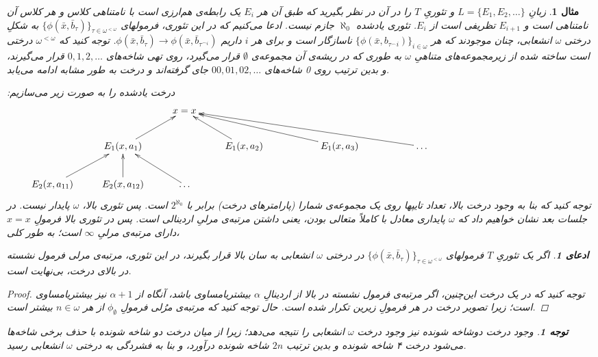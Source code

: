\documentclass[12pt,a4paper]{report}
\theoremstyle{colorhead}
\newtheorem{mesal}[thm]{مثال}
\newtheorem{tav}[thm]{توجه}
\newtheorem{claim}[thm]{ادعای}
\begin{document}
\begin{mesal}
زبانِ
$L=\{E_1,E_2,\ldots\}$
و تئوریِ
$T$
را در آن در نظر بگیرید که طبق آن هر
$E_i$
یک رابطه‌ی هم‌ارزی است با نامتناهی کلاس و هر کلاس آن نامتناهی است و 
$E_{i+1}$
تظریفی است از
$E_i$.
تئوری یادشده 
$\aleph_0$
جازم نیست. ادعا می‌کنیم که 
در این تئوری،
فرمولهای
$\{\phi(\bar{x},\bar{b}_\tau)\}_{\tau\in \omega^{<\omega}}$
به شکلِ درختی
$\omega$
انشعابی،
چنان موجودند که هر
$\{\phi(\bar{x},b_{\tau^\frown i})\}_{i\in \omega}$
ناسازگار است و 
برای هر
$i$
داریم
$\phi(\bar{x},\bar{b}_\tau)\to \phi(\bar{x},\bar{b}_{\tau^{\frown i}})$.
توجه کنید که
$\omega^{<\omega}$
درختی است ساخته شده از زیرمجموعه‌های متناهیِ
$\omega$
به طوری که در  ریشه‌ی آن مجموعه‌ی
$\emptyset$ 
قرار می‌گیرد، روی تهی شاخه‌های
$0,1,2,\ldots$
قرار می‌گیرند، و بدین ترتیب روی 0 شاخه‌های
$00,01,02,\ldots$
جای گرفته‌اند و درخت به طور مشابه ادامه می‌یابد.
\par 
درخت یادشده را به صورت زیر می‌سازیم:
\[
\xymatrix{
 & & x=x&  & & &  &  &  & &  & &
\\
 & E_1(x,a_1) \ar[ur]&  & E_1(x,a_2)\ar[ul]&  & E_1(x,a_3)\ar[ulll]& & \ar[ulllll] \ldots &  & & & &
\\
E_2(x,a_{11})\ar[ur] & E_2(x,a_{12})\ar[u]& \ldots \ar[ul]& & & & & & 
& & &  &
}
\]
توجه کنید که بنا به وجود درخت بالا، تعداد تایپها روی یک مجموعه‌ی شمارا (پارامترهای درخت) 
برابر با
$2^{\aleph_0}$
است. پس تئوری بالا،
$\omega$
پایدار نیست. در جلسات بعد نشان خواهیم داد که
$\omega$
پایداری معادل با کاملاً متعالی بودن، یعنی داشتن مرتبه‌ی مرلیِ اردینالی است.
پس در تئوری بالا فرمولِ
$x=x$
دارای مرتبه‌ی مرلیِ
$\infty$
است؛ به طور کلی، 
\begin{claim}
اگر یک تئوریِ
$T$
فرمولهای
$\{\phi(\bar{x},\bar{b}_\tau)\}_{\tau\in \omega^{<\omega}}$
در درختی
$\omega$
انشعابی
به سان بالا قرار بگیرند، در این تئوری، مرتبه‌ی مرلی فرمول نشسته در بالای درخت، بی‌نهایت است.
\end{claim}
\begin{proof}
توجه کنید که در یک درخت این‌چنین، اگر مرتبه‌ی فرمول نشسته در بالا از اردینالِ
$\alpha$
بیشتریامساوی باشد، آنگاه از
$\alpha+1$
نیز بیشتریامساوی است؛ زیرا تصویر درخت در هر فرمولِ زیرین تکرار شده است. حال توجه کنید که
مرتبه‌ی مرُلی فرمولِ
$\phi_\emptyset$
از هر 
$n\in \omega$
بیشتر است. 
\end{proof}
\begin{tav}
وجود درخت دوشاخه شونده نیز وجود درخت
$\omega$
انشعابی را نتیجه می‌دهد؛ زیرا از میان درخت دو شاخه شونده با حذف برخی شاخه‌ها می‌شود
درخت ۴ شاخه شونده و بدین ترتیب 
$2n$
شاخه شونده درآورد، و بنا به فشردگی به درختی 
$\omega$
انشعابی رسید.
\end{tav}
\end{mesal}
\end{document}
